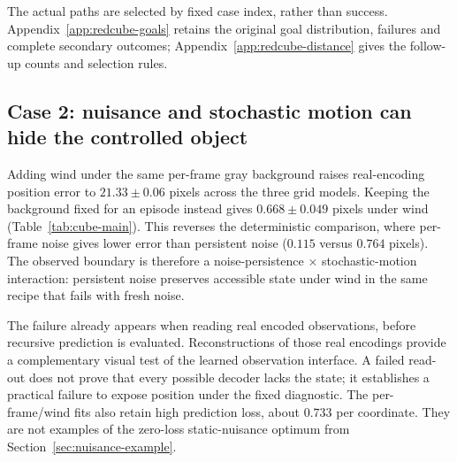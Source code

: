 The actual paths are selected by fixed case index, rather than success. Appendix~\ref{app:redcube-goals}
retains the original goal distribution, failures and complete secondary outcomes; Appendix~\ref{app:redcube-distance}
gives the follow-up counts and selection rules.

\subsection{Case 2: nuisance and stochastic motion can hide the controlled object}
\label{sec:case-two}

Adding wind under the same per-frame gray background raises real-encoding position error to
$21.33\pm0.06$ pixels across the three grid models. Keeping the background fixed for an episode
instead gives $0.668\pm0.049$ pixels under wind (Table~\ref{tab:cube-main}). This reverses the deterministic comparison, where per-frame noise gives lower error than
persistent noise ($0.115$ versus $0.764$ pixels). The observed boundary is therefore a
noise-persistence $\times$ stochastic-motion interaction: persistent noise preserves accessible
state under wind in the same recipe that fails with fresh noise.

\begin{table}[t]
\centering
\caption{\textbf{The same spatial JEPA exposes state in three conditions and fails the same read-out
in the fourth.} Position L1 error in pixels, mean $\pm$ sample standard deviation across three model
fits; architecture, 512-dimensional latent, training data size, and update count are fixed. ``Real''
uses encodings of held-out observations; predicted states use the same read-out eight steps ahead.}
\label{tab:cube-main}
\end{table}

The failure already appears when reading real encoded observations, before recursive prediction
is evaluated. Reconstructions of those real encodings provide a complementary visual test of the
learned observation interface. A failed read-out does not prove that every possible decoder lacks
the state; it establishes a practical failure to expose position under the fixed diagnostic.
The per-frame/wind fits also retain high prediction loss, about $0.733$ per coordinate. They are
not examples of the zero-loss static-nuisance optimum from Section~\ref{sec:nuisance-example}.


